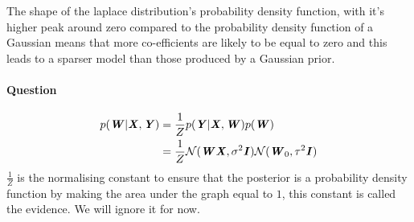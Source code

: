 \documentclass{article}
\newcounter{question}
\newcommand{\question}{\stepcounter{question}\paragraph{Question \thequestion}}
\newcommand{\mat}[1]{\textbf{\textit{#1}}}
\begin{document}
The shape of the laplace distribution's probability density function, with it's higher peak around zero compared to the probability density function of a Gaussian means that more co-efficients are likely to be equal to zero and this leads to a sparser model than those produced by a Gaussian prior.
\question
\begin{align*}
	p(\mat{W}|\mat{X},\mat{Y}) &= \frac{1}{Z}p(\mat{Y}|\mat{X},\mat{W})p(\mat{W}) \\
	&= \frac{1}{Z}\mathcal{N}(\mat{W}\mat{X},\sigma^2\mat{I})\mathcal{N}(\mat{W}_0,\tau^2\mat{I})
\end{align*}
$\frac{1}{Z}$ is the normalising constant to ensure that the posterior is a probability density function by making the area under the graph equal to $1$, this constant is called the evidence. We will ignore it for now.
\end{document}
